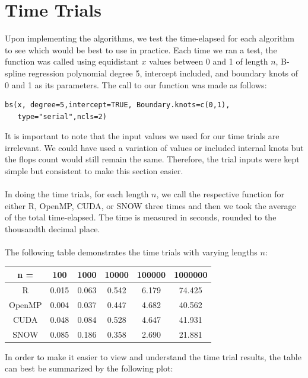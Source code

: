\section{Time Trials}
Upon implementing the algorithms, we test the time-elapsed for each algorithm to see which would be best to use in practice. Each time we ran a test, the function was called using equidistant $x$ values between 0 and 1 of length $n$, B-spline regression polynomial degree 5, intercept included, and boundary knots of 0 and 1 as its parameters. The call to our function was made as follows:
\begin{verbatim}
bs(x, degree=5,intercept=TRUE, Boundary.knots=c(0,1),
   type="serial",ncls=2)
\end{verbatim}
It is important to note that the input values we used for our time trials are irrelevant. We could have used a variation of values or included internal knots but the flops count would still remain the same. Therefore, the trial inputs were kept simple but consistent to make this section easier.
\\ \\
In doing the time trials, for each length $n$, we call the respective function for either R, OpenMP, CUDA, or SNOW three times and then we took the average of the total time-elapsed. The time is measured in seconds, rounded to the thousandth decimal place.
\\ \\
The following table demonstrates the time trials with varying lengths $n$:
\begin{center}\begin{tabular}{|c||c|c|c|c|c|} \hline
n = &100& 1000& 10000& 100000& 1000000 \\ \hline \hline
R &0.015& 0.063& 0.542& 6.179& 74.425\\ \hline
OpenMP &0.004& 0.037 &0.447& 4.682& 40.562\\ \hline
CUDA &0.048 &0.084 &0.528 &4.647 &41.931\\ \hline
SNOW &0.085 &0.186 &0.358 &2.690& 21.881 \\ \hline
\end{tabular}\end{center}
In order to make it easier to view and understand the time trial results, the table can best be summarized by the following plot:


